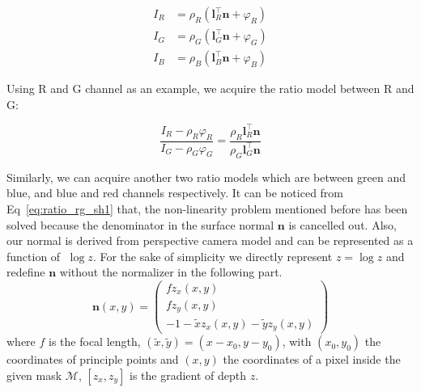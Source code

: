 \begin{equation}\label{eq:ratio_prepare}
    \begin{split}
    I_R &= \rho_R(\mathbf{l}_R^\top \mathbf{n} + \varphi_R)\\
    I_G &= \rho_G(\mathbf{l}_G^\top \mathbf{n} + \varphi_G)\\
    I_B &= \rho_B(\mathbf{l}_B^\top \mathbf{n} + \varphi_B)
    \end{split}
\end{equation}

Using R and G channel as an example, we acquire the ratio model between R and G:

\begin{equation}\label{eq:ratio_rg_sh1}
\frac{I_R - \rho_R \varphi_R}{I_G - \rho_G \varphi_G} = \frac{\rho_R \mathbf{l}_R^\top \mathbf{n}}{\rho_G \mathbf{l}_G^\top \mathbf{n}}
\end{equation}

Similarly, we can acquire another two ratio models which are between green and blue, and blue and red channels respectively.
It can be noticed from Eq~\ref{eq:ratio_rg_sh1} that, the non-linearity problem mentioned before has been solved because the denominator in the surface normal $\mathbf{n}$ is cancelled out.
Also, our normal is derived from perspective camera model and can be represented as a function of $\; \log z$. 
For the sake of simplicity we directly represent $z = \log z$ and redefine $\mathbf{n}$ without the normalizer in the following part.
\begin{equation}\label{eq:ratio_normal}
    \mathbf{n}(x,y) =
     \begin{pmatrix}
         fz_x(x,y)\\
         fz_y(x,y)\\
         -1 - \tilde{x}z_x(x,y) - \tilde{y}z_y(x,y)
     \end{pmatrix}
\end{equation}
where $f$ is the focal length, $(\tilde{x}, \tilde{y}) = (x- x_0, y - y_0)$, with $(x_0, y_0)$ the coordinates of principle points and $(x,y)$ the coordinates of a pixel inside the given mask $\mathcal{M}$, $[z_x, z_y]$ is the gradient of depth $z$.

